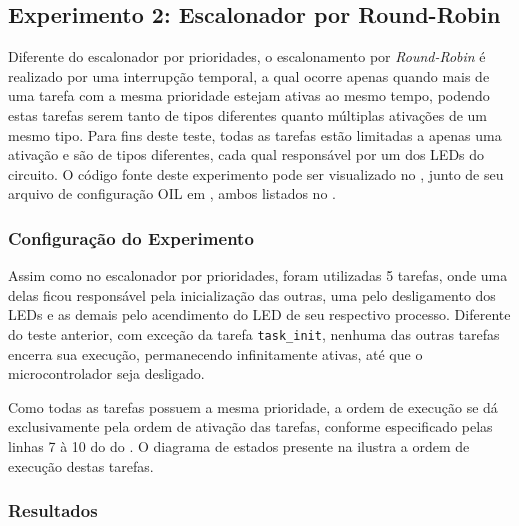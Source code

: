 \subsection{Experimento 2: Escalonador por Round-Robin}

Diferente do escalonador por prioridades, o escalonamento por \emph{Round-Robin} é realizado por uma interrupção temporal, a qual ocorre apenas quando mais de uma tarefa com a mesma prioridade estejam ativas ao mesmo tempo, podendo estas tarefas serem tanto de tipos diferentes quanto múltiplas ativações de um mesmo tipo. Para fins deste teste, todas as tarefas estão limitadas a apenas uma ativação e são de tipos diferentes, cada qual responsável por um dos LEDs do circuito. O código fonte deste experimento pode ser visualizado no , junto de seu arquivo de configuração OIL em , ambos listados no .

\subsubsection{Configuração do Experimento}

Assim como no escalonador por prioridades, foram utilizadas 5 tarefas, onde uma delas ficou responsável pela inicialização das outras, uma pelo desligamento dos LEDs e as demais pelo acendimento do LED de seu respectivo processo. Diferente do teste anterior, com exceção da tarefa \texttt{task\_init}, nenhuma das outras tarefas encerra sua execução, permanecendo infinitamente ativas, até que o microcontrolador seja desligado.

Como todas as tarefas possuem a mesma prioridade, a ordem de execução se dá exclusivamente pela ordem de ativação das tarefas, conforme especificado pelas linhas 7 à 10 do  do . O diagrama de estados presente na  ilustra a ordem de execução destas tarefas.


\subsubsection{Resultados}

